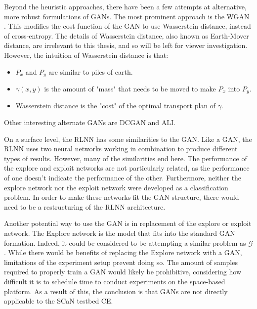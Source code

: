 	\par Beyond the heuristic approaches, there have been a few attempts at alternative, more robust formulations of GANs. The most prominent approach is the WGAN \cite{bg:wganPaper}. This modifies the cost function of the GAN to use Wasserstein distance, instead of cross-entropy. The details of Wasserstein distance, also known as Earth-Mover distance, are irrelevant to this thesis, and so will be left for viewer investigation. However, the intuition of Wasserstein distance is that:  
	\begin{itemize}
		\item $P_x$ and $P_y$ are similar to piles of earth. 
		\item $\gamma(x,y)$ is the amount of "mass" that needs to be moved to make $P_x$ into $P_y$.
		\item Wasserstein distance is the "cost" of the optimal transport plan of $\gamma$.
	\end{itemize}
	Other interesting alternate GANs are DCGAN and ALI.
	\par On a surface level, the RLNN has some similarities to the GAN. Like a GAN, the RLNN uses two neural networks working in combination to produce different types of results. However, many of the similarities end here. The performance of the explore and exploit networks are not particularly related, as the performance of one doesn't indicate the performance of the other. Furthermore, neither the explore network nor the exploit network were developed as a classification problem. In order to make these networks fit the GAN structure, there would need to be a restructuring of the RLNN architecture.
	\par Another potential way to use the GAN is in replacement of the explore or exploit network. The Explore network is the model that fits into the standard GAN formation. Indeed, it could be considered to be attempting a similar problem as $\mathcal{G}$. While there would be benefits of replacing the Explore network with a GAN, limitations of the experiment setup prevent doing so. The amount of samples required to properly train a GAN would likely be prohibitive, considering how difficult it is to schedule time to conduct experiments on the space-based platform. As a result of this, the conclusion is that GANs are not directly applicable to the SCaN testbed CE.
	
%